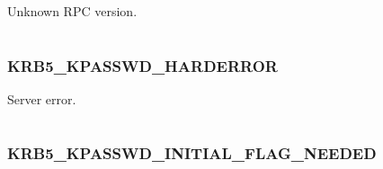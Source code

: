 \documentclass[letterpaper,10pt,english]{sphinxmanual}
\begin{document}
\begin{fulllineitems}
\label{appdev/refs/macros/KRB5_KPASSWD_BAD_VERSION:KRB5_KPASSWD_BAD_VERSION}
\end{fulllineitems}


Unknown RPC version.

\begin{tabulary}{\linewidth}{|L|L|}
\hline

 & 
\\
\hline\end{tabulary}



\subsubsection{KRB5\_KPASSWD\_HARDERROR}
\label{appdev/refs/macros/KRB5_KPASSWD_HARDERROR:krb5-kpasswd-harderror}\label{appdev/refs/macros/KRB5_KPASSWD_HARDERROR:krb5-kpasswd-harderror-data}\label{appdev/refs/macros/KRB5_KPASSWD_HARDERROR::doc}

\begin{fulllineitems}
\label{appdev/refs/macros/KRB5_KPASSWD_HARDERROR:KRB5_KPASSWD_HARDERROR}
\end{fulllineitems}


Server error.

\begin{tabulary}{\linewidth}{|L|L|}
\hline

 & 
\\
\hline\end{tabulary}



\subsubsection{KRB5\_KPASSWD\_INITIAL\_FLAG\_NEEDED}
\label{appdev/refs/macros/KRB5_KPASSWD_INITIAL_FLAG_NEEDED:krb5-kpasswd-initial-flag-needed}\label{appdev/refs/macros/KRB5_KPASSWD_INITIAL_FLAG_NEEDED::doc}\label{appdev/refs/macros/KRB5_KPASSWD_INITIAL_FLAG_NEEDED:krb5-kpasswd-initial-flag-needed-data}

\begin{fulllineitems}
\label{appdev/refs/macros/KRB5_KPASSWD_INITIAL_FLAG_NEEDED:KRB5_KPASSWD_INITIAL_FLAG_NEEDED}
\end{fulllineitems}
\end{document}
